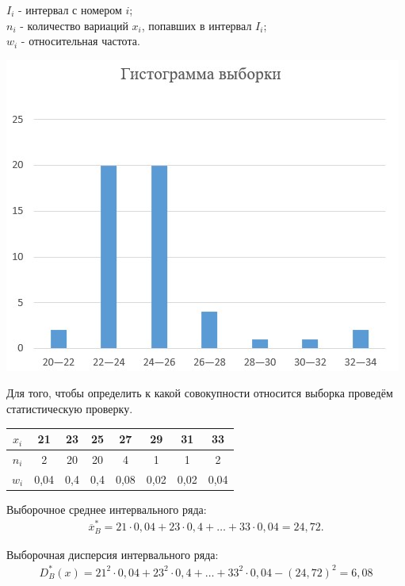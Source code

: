 \documentclass[utf8, a4paper, 14pt, russian, oneside]{book}
\begin{document}
$I_i$ - интервал с номером $i$;\\
$n_i$ - количество вариаций $x_i$, попавших в интервал $I_i$;\\
$w_i$ - относительная частота.

\begin{center}
\includegraphics[scale=0.95]{img/gisto_choice.jpg}
\end{center}

Для того, чтобы определить к какой совокупности относится выборка проведём статистическую проверку.
\newpage

\begin{table}[h!]
    \centering
    \begin{tabular}{|c|c|c|c|c|c|c|c|}
        \hline
        $x_i$ & 21 & 23 & 25 & 27 & 29 & 31 & 33\\
        \hline
        $n_i$ & 2 & 20 & 20 & 4 & 1 & 1 & 2 \\
        \hline
        $w_i$ & 0,04 & 0,4 & 0,4 & 0,08 & 0,02 & 0,02 & 0,04 \\
        \hline
    \end{tabular}
\end{table}

Выборочное среднее интервального ряда:
\begin{align*}
    \overline{x}_B^* = 21 \cdot 0,04 + 23 \cdot 0,4 + \ldots + 33 \cdot 0,04 = 24,72.
\end{align*}

Выборочная дисперсия интервального ряда:
\begin{align*}
    D^*_B(x) = 21^2 \cdot 0,04 + 23^2 \cdot 0,4 + \ldots + 33^2 \cdot 0,04 - (24,72)^2 = 6,08
\end{align*}
\end{document}
